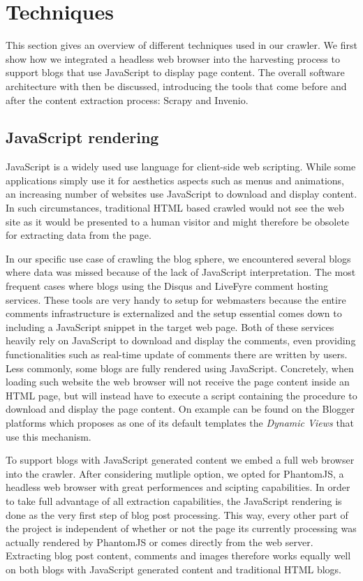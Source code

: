 \section{Techniques}

This section gives an overview of different techniques used in our crawler. We first show how we integrated a headless web browser into the harvesting process to support blogs that use JavaScript to display page content. The overall software architecture with then be discussed, introducing the tools that come before and after the content extraction process: Scrapy and Invenio.

\subsection{JavaScript rendering}
JavaScript is a widely used use language for client-side web scripting. While some applications simply use it for aesthetics aspects such as menus and animations, an increasing number of websites use JavaScript to download and display content. In such circumstances, traditional HTML based crawled would not see the web site as it would be presented to a human visitor and might therefore be obsolete for extracting data from the page.

In our specific use case of crawling the blog sphere, we encountered several blogs where data was missed because of the lack of JavaScript interpretation. The most frequent cases where blogs using the Disqus\cite{disqus2013} and LiveFyre\cite{livefyre2013} comment hosting services. These tools are very handy to setup for webmasters because the entire comments infrastructure is externalized and the setup essential comes down to including a JavaScript snippet in the target web page. Both of these services heavily rely on JavaScript to download and display the comments, even providing functionalities such as real-time update of comments there are written by users. Less commonly, some blogs are fully rendered using JavaScript. Concretely, when loading such website the web browser will not receive the page content inside an HTML page, but will instead have to execute a script containing the procedure to download and display the page content. On example can be found on the Blogger platforms which proposes as one of its default templates the \emph{Dynamic Views} \cite{antinharasymiv2011} that use this mechanism.

To support blogs with JavaScript generated content we embed a full web browser into the crawler. After considering mutliple option, we opted for PhantomJS\cite{phantomjs2013}, a headless web browser with great performences and scipting capabilities. In order to take full advantage of all extraction capabilities, the JavaScript rendering is done as the very first step of blog post processing. This way, every other part of the project is independent of whether or not the page its currently processing was actually rendered by PhantomJS or comes directly from the web server. Extracting blog post content, comments and images therefore works equally well on both blogs with JavaScript generated content and traditional HTML blogs.


